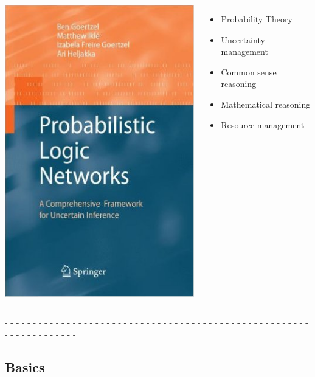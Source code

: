 \documentclass[aspectratio=169]{beamer}
\begin{document}
\begin{frame}
  \begin{columns}
    \column{2.5in}
    \includegraphics[scale=0.32]{images/PLN.jpg}\\

    \column{3in}
    \begin{itemize}
    \item Probability Theory
    \item Uncertainty management
    \item Common sense reasoning
    \item Mathematical reasoning
    \item Resource management
    \end{itemize}

  \end{columns}

  - - - - - - - - - - - - - - - - - - - - - - - - - - - - - - - - - -
  - - - - - - - - - - - - - - - - - - - - - - - - - - - - - - - - -\\[0.1cm]

\end{frame}

\subsection {Basics}
\end{document}
